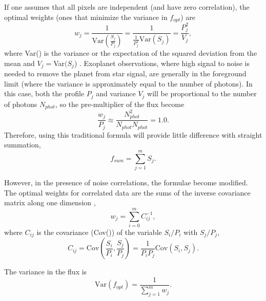 \documentclass{aastex62}
\begin{document}
If one assumes that all pixels are independent (and have zero correlation), the optimal weights (ones that minimize the variance in $f_{opt}$) are
\begin{equation}
w_j = \frac{1}{\mathrm{Var}(\frac{S_j}{P_j})} = \frac{1}{\frac{1}{P_j^2} \mathrm{Var}(S_j)} = \frac{P_j^2}{V_j},
\end{equation}
where Var() is the variance or the expectation of the squared deviation from the mean and $V_j =$Var$(S_j$) \citep{horne1986optimalE}.
Exoplanet observations, where high signal to noise is needed to remove the planet from star signal, are generally in the foreground limit (where the variance is approximately equal to the number of photons).
In this case, both the profile $P_j$ and variance $V_j$ will be proportional to the number of photons $N_{phot}$, so the pre-multiplier of the flux become
\begin{equation}
\frac{w_j}{P_j} \approx \frac{N_{phot}^2}{N_{phot} N_{phot}} = 1.0.
\end{equation}
Therefore, using this traditional formula will provide little difference with straight summation,
\begin{equation}
f_{sum} = \sum_{j=1}^{m} S_j.
\end{equation} 

However, in the presence of noise correlations, the formulae become modified.
The optimal weights for correlated data are the sums of the inverse covariance matrix along one dimension  \citep{schmelling1995averagingCorrelatedData},
\begin{equation}\label{eq:covarianceweights}
w_j = \sum_{i=0}^{m} C_{ij}^{-1},
\end{equation}
where $C_{ij}$ is the covariance (Cov()) of the variable $S_i/P_i$ with $S_j/P_j$,
\begin{equation}
C_{ij} = \mathrm{Cov}\left(\frac{S_i}{P_i},\frac{S_j}{P_j}\right) = \frac{1}{P_i P_j} \mathrm{Cov}(S_i,S_j).
\end{equation}


The variance in the flux is
\begin{equation}
\mathrm{Var}(f_{opt}) = \frac{1}{\sum_{j=1}^m w_j}.
\end{equation}
\end{document}
